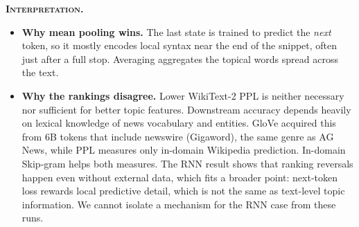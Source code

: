 \documentclass[10pt,a4paper]{article}
\newcommand{\obs}[1]{\textsc{\textbf{#1}}}
\begin{document}
\obs{Interpretation.}
\begin{itemize}
\item \textbf{Why mean pooling wins.} The last state is trained to predict the \emph{next} token, so it mostly encodes local syntax near the end of the snippet, often just after a full stop. Averaging aggregates the topical words spread across the text.
\item \textbf{Why the rankings disagree.} Lower WikiText-2 PPL is neither necessary nor sufficient for better topic features. Downstream accuracy depends heavily on lexical knowledge of news vocabulary and entities. GloVe acquired this from 6B tokens that include newswire (Gigaword), the same genre as AG News, while PPL measures only in-domain Wikipedia prediction. In-domain Skip-gram helps both measures. The RNN result shows that ranking reversals happen even without external data, which fits a broader point: next-token loss rewards local predictive detail, which is not the same as text-level topic information. We cannot isolate a mechanism for the RNN case from these runs.
\end{itemize}

\end{document}
